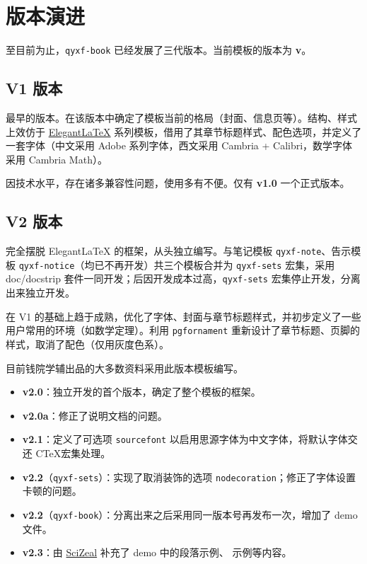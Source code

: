 \documentclass[
    10pt,
    oneside,
    openany,
    b5paper,
    colorscheme = basic  %
]{qyxf-book}
\begin{document}
\section{版本演进}

至目前为止，\verb|qyxf-book| 已经发展了三代版本。当前模板的版本为 \textbf{v\styversion}。

\subsection{V1 版本}
最早的版本。在该版本中确定了模板当前的格局（封面、信息页等）。结构、样式上效仿于 \href{https://elegantlatex.org/}{Elegant\LaTeX} 系列模板，借用了其章节标题样式、配色选项，并定义了一套字体（中文采用 Adobe 系列字体，西文采用 Cambria + Calibri，数学字体采用 Cambria Math）。

因技术水平，存在诸多兼容性问题，使用多有不便。仅有 \textbf{v1.0} 一个正式版本。

\subsection{V2 版本}

完全摆脱 Elegant\LaTeX{} 的框架，从头独立编写。与笔记模板 \verb|qyxf-note|、告示模板 \verb|qyxf-notice|（均已不再开发）共三个模板合并为 \verb|qyxf-sets| 宏集，采用 doc/docstrip 套件一同开发；后因开发成本过高，\verb|qyxf-sets| 宏集停止开发，分离出来独立开发。

在 V1 的基础上趋于成熟，优化了字体、封面与章节标题样式，并初步定义了一些用户常用的环境（如数学定理）。利用 \verb|pgfornament| 重新设计了章节标题、页脚的样式，取消了配色（仅用灰度色系）。

目前钱院学辅出品的大多数资料采用此版本模板编写。

\begin{itemize}
  \item \textbf{v2.0}：独立开发的首个版本，确定了整个模板的框架。
  \item \textbf{v2.0a}：修正了说明文档的问题。
  \item \textbf{v2.1}：定义了可选项 \verb|sourcefont| 以启用思源字体为中文字体，将默认字体交还 C\TeX 宏集处理。
  \item \textbf{v2.2}（\verb|qyxf-sets|）：实现了取消装饰的选项 \verb|nodecoration|；修正了字体设置卡顿的问题。
  \item \textbf{v2.2}（\verb|qyxf-book|）：分离出来之后采用同一版本号再发布一次，增加了 demo 文件。
  \item \textbf{v2.3}：由 \href{https://github.com/SciZeal}{SciZeal} 补充了 demo 中的段落示例、 示例等内容。
\end{itemize}
\end{document}
